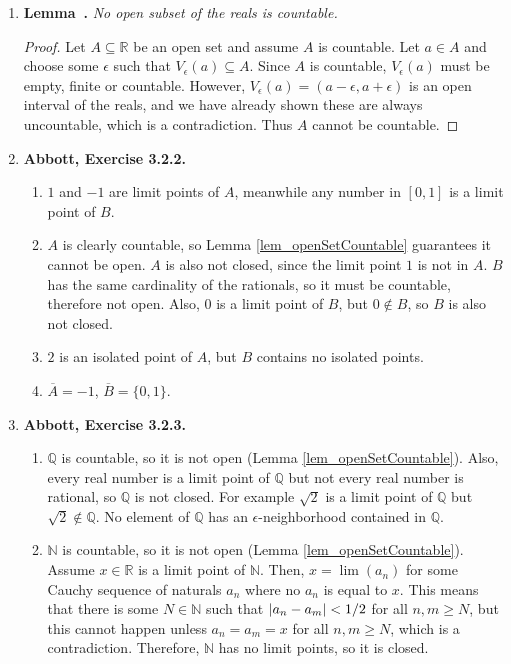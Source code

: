 \documentclass{article}
\newcounter{lemmaCounter}
\newenvironment{shortlemma}[1]{\refstepcounter{lemmaCounter}
\label{#1}\textbf{Lemma~\thelemmaCounter.}\em}
\DeclarePairedDelimiter\abs{\lvert}{\rvert}
\newcommand{\N}{\mathbb{N}}
\newcommand{\Q}{\mathbb{Q}}
\newcommand{\R}{\mathbb{R}}
\newcommand{\set}[1]{\{#1\}}
\newcommand{\exc}[2][Abbott]{\item \textbf{#1, Exercise #2.}}
\begin{document}
\begin{enumerate}
    \item \begin{shortlemma}{lem_openSetCountable}
        No open subset of the reals is countable.
    \end{shortlemma}
    
    \begin{proof}
        Let $A \subseteq \R$ be an open set and assume $A$ is countable. Let $a \in A$ and choose some $\epsilon$ such that $V_\epsilon(a) \subseteq A$. Since $A$ is countable, $V_\epsilon(a)$ must be empty, finite or countable. However, $V_\epsilon(a) = (a-\epsilon, a+\epsilon)$ is an open interval of the reals, and we have already shown these are always uncountable, which is a contradiction. Thus $A$ cannot be countable.
    \end{proof}
    
    \exc{3.2.2}
    \begin{enumerate}
        \item $1$ and $-1$ are limit points of $A$, meanwhile any number in $[0, 1]$ is a limit point of $B$.
        
        \item $A$ is clearly countable, so Lemma \ref{lem_openSetCountable} guarantees it cannot be open. $A$ is also not closed, since the limit point $1$ is not in $A$. $B$ has the same cardinality of the rationals, so it must be countable, therefore not open. Also, $0$ is a limit point of $B$, but $0 \notin B$, so $B$ is also not closed.
        
        \item $2$ is an isolated point of $A$, but $B$ contains no isolated points.
        
        \item $\overline{A} = -1$, $\overline{B} = \set{0, 1}$.
    \end{enumerate}
    
    \exc{3.2.3}
    \begin{enumerate}
        \item $\Q$ is countable, so it is not open (Lemma \ref{lem_openSetCountable}). Also, every real number is a limit point of $\Q$ but not every real number is rational, so $\Q$ is not closed. For example $\sqrt{2}$ is a limit point of $\Q$ but $\sqrt{2} \notin \Q$. No element of $\Q$ has an $\epsilon$-neighborhood contained in $\Q$.
        
        \item $\N$ is countable, so it is not open (Lemma \ref{lem_openSetCountable}). Assume $x \in \R$ is a limit point of $\N$. Then, $x = \lim(a_n)$ for some Cauchy sequence of naturals $a_n$ where no $a_n$ is equal to $x$. This means that there is some $N \in \N$ such that $\abs*{a_n-a_m} < 1/2$ for all $n,m \geq N$, but this cannot happen unless $a_n = a_m = x$ for all $n,m \geq N$, which is a contradiction. Therefore, $\N$ has no limit points, so it is closed.
        

\end{enumerate}
\end{enumerate}
\end{document}
